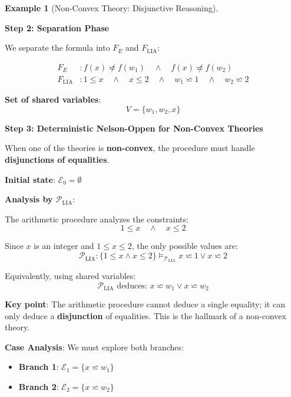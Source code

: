 \documentclass[11pt,a4paper]{article}
\theoremstyle{definition}
\newtheorem{example}{Example}[section]
\theoremstyle{plain}
\theoremstyle{remark}
\begin{document}
\begin{example}[Non-Convex Theory: Disjunctive Reasoning]
\begin{tcolorbox}[colback=purple!5!white,colframe=purple!75!black,title=\textbf{Example 3: Non-Convex $\mathcal{T}_{\text{LIA}}$ with Disjunctions},breakable]
\vspace{0.5em}

\textbf{Step 2: Separation Phase}

We separate the formula into $F_E$ and $F_{\text{LIA}}$:

\begin{align*}
F_E &: f(x) \not\backsimeq f(w_1) \quad \wedge \quad f(x) \not\backsimeq f(w_2) \\
F_{\text{LIA}} &: 1 \leq x \quad \wedge \quad x \leq 2 \quad \wedge \quad w_1 \backsimeq 1 \quad \wedge \quad w_2 \backsimeq 2
\end{align*}

\textbf{Set of shared variables}:
\[
V = \{w_1, w_2, x\}
\]

\vspace{0.5em}

\textbf{Step 3: Deterministic Nelson-Oppen for Non-Convex Theories}

When one of the theories is \textbf{non-convex}, the procedure must handle \textbf{disjunctions of equalities}.

\textbf{Initial state}: $\mathcal{E}_0 = \emptyset$

\vspace{0.3em}

\textbf{Analysis by $\mathcal{P}_{\text{LIA}}$}:

The arithmetic procedure analyzes the constraints:
\[
1 \leq x \quad \wedge \quad x \leq 2
\]

Since $x$ is an integer and $1 \leq x \leq 2$, the only possible values are:
\[
\mathcal{P}_{\text{LIA}}: \{1 \leq x \wedge x \leq 2\} \models_{\mathcal{T}_{\text{LIA}}} x \backsimeq 1 \vee x \backsimeq 2
\]

Equivalently, using shared variables:
\[
\mathcal{P}_{\text{LIA}} \text{ deduces: } x \backsimeq w_1 \vee x \backsimeq w_2
\]

\textbf{Key point}: The arithmetic procedure cannot deduce a single equality; it can only deduce a \textbf{disjunction} of equalities. This is the hallmark of a non-convex theory.

\vspace{0.3em}

\textbf{Case Analysis}: We must explore both branches:

\begin{itemize}
    \item \textbf{Branch 1}: $\mathcal{E}_1 = \{x \backsimeq w_1\}$
    \item \textbf{Branch 2}: $\mathcal{E}_2 = \{x \backsimeq w_2\}$
\end{itemize}


\end{tcolorbox}
\end{example}
\end{document}
